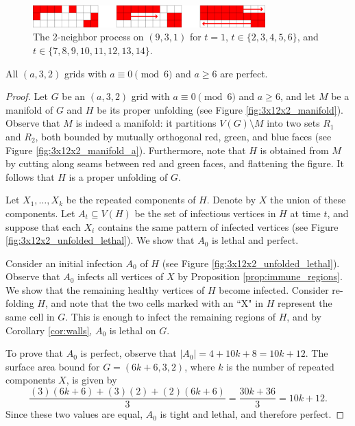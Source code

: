 \begin{figure}[]
\centering
\includegraphics[width=0.8\textwidth]{figures/7/3x9x1.pdf}
\caption{The 2-neighbor process on $(9,3,1)$ for $t=1$, $t \in \{2,3,4,5,6\}$, and $t \in \{7,8,9,10,11,12,13,14\}$.}
\label{fig:9x3x1}
\end{figure} 

\begin{con}
All $(a,3,2)$ grids with $a \equiv 0 \pmod 6$ and $a \geq 6$ are perfect. 
\end{con}

\begin{proof}
Let $G$ be an $(a,3,2)$ grid with $a \equiv 0 \pmod 6$ and $a \geq 6$, and let $M$ be a manifold of $G$ and $H$ be its proper unfolding (see Figure \ref{fig:3x12x2_manifold}). Observe that $M$ is indeed a manifold: it partitions $V(G) \setminus M$ into two sets $R_1$ and $R_2$, both bounded by mutually orthogonal red, green, and blue faces (see Figure \ref{fig:3x12x2_manifold_a}). Furthermore, note that $H$ is obtained from $M$ by cutting along seams between red and green faces, and flattening the figure. It follows that $H$ is a proper unfolding of $G$. 

Let $X_1, \dots, X_k$ be the repeated components of $H$. Denote by $X$ the union of these components. Let $A_t \subseteq V(H)$ be the set of infectious vertices in $H$ at time $t$, and suppose that each $X_i$ contains the same pattern of infected vertices (see Figure \ref{fig:3x12x2_unfolded_lethal}). We show that $A_0$ is lethal and perfect.

Consider an initial infection $A_0$ of $H$ (see Figure \ref{fig:3x12x2_unfolded_lethal}). Observe that $A_0$ infects all vertices of $X$ by Proposition \ref{prop:immune_regions}. We show that the remaining healthy vertices of $H$ become infected. Consider re-folding $H$, and note that the two cells marked with an ``X" in $H$ represent the same cell in $G$. This is enough to infect the remaining regions of $H$, and by Corollary \ref{cor:walls}, $A_0$ is lethal on $G$. 

To prove that $A_0$ is perfect, observe that $|A_0| = 4 + 10k + 8 = 10k +12$. The surface area bound for $G=(6k+6,3,2)$, where $k$ is the number of repeated components $X$, is given by
$$\frac{(3)(6k+6) + (3)(2) + (2)(6k+6)}{3} = \frac{30k + 36}{3} = 10k+12.$$
Since these two values are equal, $A_0$ is tight and lethal, and therefore perfect.
\end{proof}

